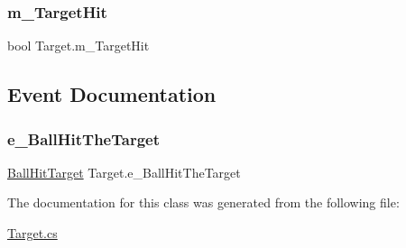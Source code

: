 \mbox{\label{class_target_abfdb205d5c2872d5d983b4e617eb5e40}} 
\subsubsection{\texorpdfstring{m\+\_\+\+Target\+Hit}{m\_TargetHit}}
{\footnotesize\ttfamily bool Target.\+m\+\_\+\+Target\+Hit\hspace{0.3cm}{\ttfamily [private]}}



\subsection{Event Documentation}
\mbox{\label{class_target_aa54347b745ba5f74774bda61839cce75}} 
\subsubsection{\texorpdfstring{e\+\_\+\+Ball\+Hit\+The\+Target}{e\_BallHitTheTarget}}
{\footnotesize\ttfamily \mbox{\hyperlink{class_target_a4f2a0b66fecc85bdcf301cc9ab926898}{Ball\+Hit\+Target}} Target.\+e\+\_\+\+Ball\+Hit\+The\+Target\hspace{0.3cm}{\ttfamily [static]}}



The documentation for this class was generated from the following file\+:\begin{DoxyCompactItemize}
\item 
\mbox{\hyperlink{_target_8cs}{Target.\+cs}}\end{DoxyCompactItemize}
